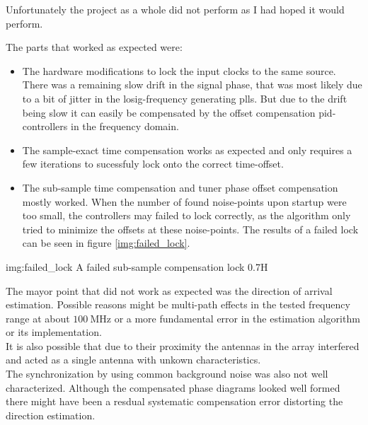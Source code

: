 Unfortunately the project as a whole did not
perform as I had hoped it would perform.

\noindent
The parts that worked as expected were:

\begin{itemize}
  \item
    The hardware modifications to lock the input clocks
    to the same source. \\
    There was a remaining slow drift in
    the signal phase, that was most likely due to a bit of jitter
    in the \acrshort{losig}-frequency generating \glspl{pll}.
    But due to the drift being slow it can easily be compensated by
    the offset compensation \acrshort{pid}-controllers in the frequency domain.

  \item
    The sample-exact time compensation works as expected and
    only requires a few iterations to sucessfuly lock onto
    the correct time-offset.

  \item
    The sub-sample time compensation and tuner phase
    offset compensation mostly worked.
    When the number of found noise-points upon startup
    were too small, the controllers may failed to lock
    correctly, as the algorithm only tried to minimize the
    offsets at these noise-points.
    The results of a failed lock can be seen in figure
    \ref{img:failed_lock}.
\end{itemize}

             {img:failed_lock}
             {A failed sub-sample compensation lock}
             {0.7}{H}

The mayor point that did not work as expected was the direction
of arrival estimation. Possible reasons might be
multi-path effects in the tested frequency range
at about $\SI{100}{\mega\hertz}$ or a more
fundamental error in the estimation algorithm
or its implementation. \\

It is also possible that due to their proximity
the antennas in the array interfered and acted
as a single antenna with unkown characteristics. \\

The synchronization by using common background noise
was also not well characterized.
Although the compensated phase diagrams looked well
formed there might have been a resdual systematic
compensation error distorting the direction estimation.

